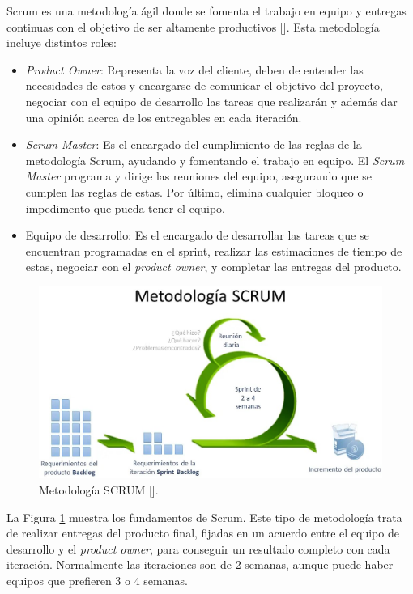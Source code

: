 Scrum es una metodología ágil donde se fomenta el trabajo en equipo y entregas continuas con el objetivo de ser altamente productivos [\cite{92}]. Esta metodología incluye distintos roles:
\begin{itemize}
\item \textit{Product Owner}: Representa la voz del cliente, deben de entender las necesidades de estos y encargarse de comunicar el objetivo del proyecto, negociar con el equipo de desarrollo las tareas que realizarán y además dar una opinión acerca de los entregables en cada iteración.
\item \textit{Scrum Master}: Es el encargado del cumplimiento de las reglas de la metodología Scrum, ayudando y fomentando el trabajo en equipo. El \textit{Scrum Master} programa y dirige las reuniones del equipo, asegurando que se cumplen las reglas de estas. Por último, elimina cualquier bloqueo o impedimento que pueda tener el equipo.
\item Equipo de desarrollo: Es el encargado de desarrollar las tareas que se encuentran programadas en el sprint, realizar las estimaciones de tiempo de estas, negociar con el \textit{product owner}, y completar las entregas del producto.
\end{itemize}

\begin{figure}[htbp]
\centering
\includegraphics[scale=0.3]{Graphics/SCRUM}
\caption{Metodología SCRUM [\cite{94}].}
\label{fig:SCRUM}
\end{figure}

La Figura \ref{fig:SCRUM} muestra los fundamentos de Scrum. Este tipo de metodología trata de realizar entregas del producto final, fijadas en un acuerdo entre el equipo de desarrollo y el \textit{product owner}, para conseguir un resultado completo con cada iteración. Normalmente las iteraciones son de 2 semanas, aunque puede haber equipos que prefieren 3 o 4 semanas.

